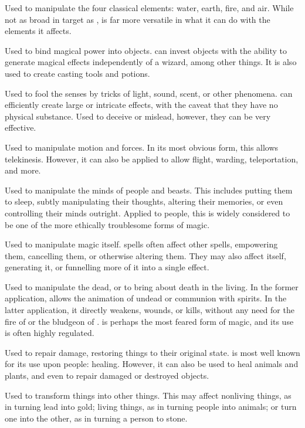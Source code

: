 
Used to manipulate the four classical elements: water, earth, fire, and air.
While not as broad in target as ,  is far more versatile in what it can do with the elements it affects.


Used to bind magical power into objects.
 can invest objects with the ability to generate magical effects independently of a wizard, among other things.
It is also used to create casting tools and potions.


Used to fool the senses by tricks of light, sound, scent, or other phenomena.
 can efficiently create large or intricate effects, with the caveat that they have no physical substance.
Used to deceive or mislead, however, they can be very effective.


Used to manipulate motion and forces.
In its most obvious form, this allows telekinesis.
However, it can also be applied to allow flight, warding, teleportation, and more.


Used to manipulate the minds of people and beasts.
This includes putting them to sleep, subtly manipulating their thoughts, altering their memories, or even controlling their minds outright.
Applied to people, this is widely considered to be one of the more ethically troublesome forms of magic.


Used to manipulate magic itself.
 spells often affect other spells, empowering them, cancelling them, or otherwise altering them.
They may also affect {\mana} itself, generating it, or funnelling more of it into a single effect.


Used to manipulate the dead, or to bring about death in the living.
In the former application,  allows the animation of undead or communion with spirits.
In the latter application, it directly weakens, wounds, or kills, without any need for the fire of  or the bludgeon of .
 is perhaps the most feared form of magic, and its use is often highly regulated.


Used to repair damage, restoring things to their original state.
 is most well known for its use upon people: healing.
However, it can also be used to heal animals and plants, and even to repair damaged or destroyed objects.


Used to transform things into other things.
This may affect nonliving things, as in turning lead into gold; living things, as in turning people into animals; or turn one into the other, as in turning a person to stone.
